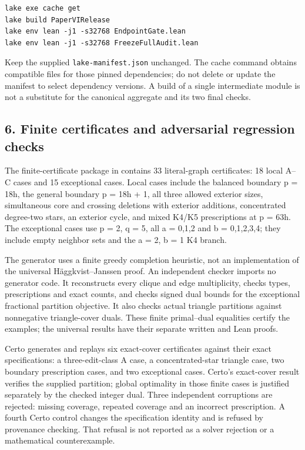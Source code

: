 \documentclass[english,11pt,a4paper]{article}
\begin{document}
\begin{verbatim}
lake exe cache get
lake build PaperVIRelease
lake env lean -j1 -s32768 EndpointGate.lean
lake env lean -j1 -s32768 FreezeFullAudit.lean
\end{verbatim}

Keep the supplied \texttt{lake-manifest.json} unchanged. The cache
command obtains compatible files for those pinned dependencies; do not
delete or update the manifest to select dependency versions. A build of
a single intermediate module is not a substitute for the canonical
aggregate and its two final checks.

\subsection{6. Finite certificates and adversarial regression
checks}\label{finite-certificates-and-adversarial-regression-checks}

The finite-certificate package in  contains
33 literal-graph certificates: 18 local A--C cases and 15 exceptional
cases. Local cases include the balanced boundary p = 18h, the general
boundary p = 18h + 1, all three allowed exterior sizes, simultaneous
core and crossing deletions with exterior additions, concentrated
degree-two stars, an exterior cycle, and mixed K4/K5 prescriptions at p
= 63h. The exceptional cases use p = 2, q = 5, all a = 0,1,2 and b =
0,1,2,3,4; they include empty neighbor sets and the a = 2, b = 1 K4
branch.

The generator uses a finite greedy completion heuristic, not an
implementation of the universal Häggkvist--Janssen proof. An independent
checker imports no generator code. It reconstructs every clique and edge
multiplicity, checks types, prescriptions and exact counts, and checks
signed dual bounds for the exceptional fractional partition objective.
It also checks actual triangle partitions against nonnegative
triangle-cover duals. These finite primal--dual equalities certify the
examples; the universal results have their separate written and Lean
proofs.

Certo generates and replays six exact-cover certificates against their
exact specifications: a three-edit-class A case, a concentrated-star
triangle case, two boundary prescription cases, and two exceptional
cases. Certo's exact-cover result verifies the supplied partition;
global optimality in those finite cases is justified separately by the
checked integer dual. Three independent corruptions are rejected:
missing coverage, repeated coverage and an incorrect prescription. A
fourth Certo control changes the specification identity and is refused
by provenance checking. That refusal is not reported as a solver
rejection or a mathematical counterexample.
\end{document}
